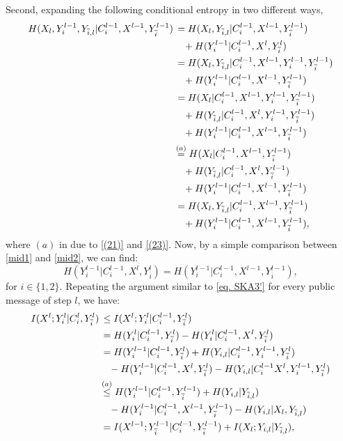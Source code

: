 \documentclass[runningheads]{llncs}
\begin{document}
Second, expanding the following conditional entropy in two different ways,
\begin{align}\label{mid1}
H(X_l, Y_i^{l-1}, Y_{\overline{i},l} | C_i^{l-1}, X^{l-1}, Y_{\overline{i}}^{l-1})
& \,= H(X_l, Y_{\overline{i},l} | C_i^{l-1}, X^{l-1}, Y_{\overline{i}}^{l-1}) \notag\\
& \quad+ H(Y_i^{l-1} |C_i^{l-1}, X^{l}, Y_{\overline{i}}^l)\\
& \,= H(X_l, Y_{\overline{i},l} | C_i^{l-1}, X^{l-1}, Y_i^{l-1}, Y_{\overline{i}}^{l-1})\notag\\
& \quad + H(Y_i^{l-1} | C_i^{l-1}, X^{l-1}, Y_{\overline{i}}^{l-1})\notag\\
& \,= H(X_l | C_i^{l-1}, X^{l-1}, Y_i^{l-1}, Y_{\overline{i}}^{l-1})\notag\\
& \quad+ H(Y_{\overline{i},l} | C_i^{l-1}, X^{l}, Y_i^{l-1}, Y_{\overline{i}}^{l-1})\notag\\
&\quad + H(Y_i^{l-1} | C_i^{l-1}, X^{l-1}, Y_{\overline{i}}^{l-1})\notag\\
& \overset{(a)}{=} H(X_l | C_i^{l-1}, X^{l-1}, Y_{\overline{i}}^{l-1})\notag\\
& \quad+ H(Y_{\overline{i},l} | C_i^{l-1}, X^{l}, Y_{\overline{i}}^{l-1})\notag\\
&\quad + H(Y_i^{l-1} | C_i^{l-1}, X^{l-1}, Y_{\overline{i}}^{l-1})\notag\\\label{mid2}
& \,= H(X_l, Y_{\overline{i},l}|C_i^{l-1}, X^{l-1}, Y_{\overline{i}}^{l-1})\notag\\
&\quad + H(Y_i^{l-1} | C_i^{l-1}, X^{l-1}, Y_{\overline{i}}^{l-1}),
\end{align}
where $(a)$ in due to \eqref{(21)} and \eqref{(23)}. Now, by a simple comparison between \eqref{mid1} and \eqref{mid2}, we can find:
\begin{equation}\label{(25)}
     H(Y_i^{l-1} | C_i^{l-1}, X^{l}, Y_{\overline{i}}^{l}) = H(Y_i^{l-1} | C_i^{l-1}, X^{l-1}, Y_{\overline{i}}^{l-1}), 
\end{equation}
for $i \in\{1,2\}$. Repeating the argument similar to \eqref{eq. SKA3'} for every public message of step $l$, we have:
\begin{align}\label{(26')}
I(X^{l}; Y_i^{l} | C_i^{l}, Y_{\overline{i}}^{l}) &\, \leq I(X^{l}; Y_i^{l} | C_i^{l-1}, Y_{\overline{i}}^{l})\notag\\
& \,= H(Y_i^{l} | C_i^{l-1}, Y_{\overline{i}}^{l}) - H(Y_i^{l} | C_i^{l-1}, X^{l}, Y_{\overline{i}}^{l}) \notag \\
& \,= H(Y_i^{l-1} | C_i^{l-1}, Y_{\overline{i}}^{l}) 
  + H(Y_{i,l} | C_i^{l-1}, Y_i^{l-1}, Y_{\overline{i}}^{l}) \notag \\
&\quad - H(Y_i^{l-1} | C_i^{l-1}, X^{l}, Y_{\overline{i}}^{l})
  - H(Y_{i,l} | C_i^{l-1} X^{l}, Y_i^{l-1}, Y_{\overline{i}}^{l}) \notag \\
&\overset{(a)}{\leq} H(Y_i^{l-1} | C_i^{l-1}, Y_{\overline{i}}^{l-1}) + H(Y_{i,l} | Y_{\overline{i},l}) \notag \\
&\quad - H(Y_i^{l-1} | C_i^{l-1}, X^{l-1}, Y_{\overline{i}}^{l-1})
  - H(Y_{i,l} | X_l, Y_{\overline{i},l}) \notag \\
& \,= I(X^{l-1}; Y_{\overline{i}}^{l-1} | C_i^{l-1}, Y_{\overline{i}}^{l-1}) 
  + I(X_l; Y_{i,l} | Y_{\overline{i},l}),
\end{align}
\end{document}
